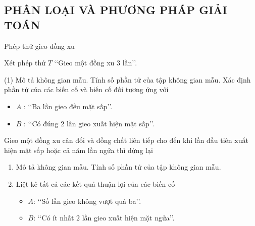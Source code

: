 \subsection{PHÂN LOẠI VÀ PHƯƠNG PHÁP GIẢI TOÁN}
\begin{dang}{Phép thử gieo đồng xu}
\end{dang}
\begin{vd}
	Xét phép thử $T$ \lq\lq Gieo một đồng xu 3 lần\rq\rq. 
	\begin{tasks}(1)
		\task Mô tả không gian mẫu. Tính số phần tử của tập không gian mẫu.
		\task Xác định phần tử của các biến cố và biến cố đối tương ứng với
		\begin{itemize}
			\item [$\bullet$] $A$ : \lq\lq Ba lần gieo đều mặt sấp\rq\rq.
			\item [$\bullet$] $B$ : \lq\lq Có đúng 2 lần gieo xuất hiện mặt sấp\rq\rq.
		\end{itemize}
	\end{tasks}
\end{vd} 
\vspace{-0.8cm}
\begin{vd}
	Gieo một đồng xu cân đối và đồng chất liên tiếp cho đến khi lần đầu tiên xuất hiện mặt sấp hoặc cả năm lần ngửa thì dừng lại
	\begin{enumerate}
		\item Mô tả không gian mẫu. Tính số phần tử của tập không gian mẫu.
		\item Liệt kê tất cả các kết quả thuận lợi của các biến cố
		\begin{itemize}
			\item [$\bullet$] $A$: \lq\lq Số lần gieo không vượt quá ba\rq\rq.
			\item [$\bullet$] $B$: \lq\lq Có ít nhất $2$ lần gieo xuất hiện mặt ngửa\rq\rq.
		\end{itemize}
	\end{enumerate}
\end{vd} 

